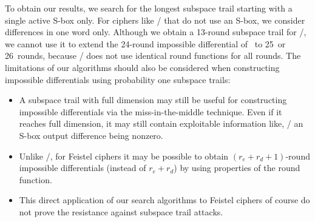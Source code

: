 To obtain our results, we search for the longest subspace trail starting with a single active S-box only.
For ciphers like \simon/ that do not use an S-box, we consider differences in one word only.
Although we obtain a 13-round subspace trail for \skipjack/, we cannot use it to extend the 24-round impossible differential of~ to 25~or 26~rounds, because \skipjack/ does not use identical round functions for all rounds.
The limitations of our algorithms should also be considered when constructing impossible differentials using probability one subspace trails:
\begin{itemize}
\item A subspace trail with full dimension may still be useful for constructing impossible differentials via the miss-in-the-middle technique.
        Even if it reaches full dimension, it may still contain exploitable information like, \eg/ an S-box output difference being nonzero.
\item Unlike \SPN/, for Feistel ciphers it may be possible to obtain $(r_e+r_d+1)$-round impossible differentials (instead of $r_e+r_d$) by using properties of the round function.
\item This direct application of our search algorithms to Feistel ciphers of course do not prove the resistance against subspace trail attacks.
\end{itemize}

